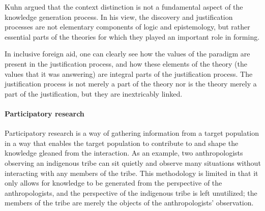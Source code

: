 \documentclass[a4paper]{article}
\begin{document}
Kuhn argued that the context distinction is not a fundamental aspect of the
knowledge generation process. In his view, the discovery and justification
processes are not elementary components of logic and epistemology, but rather
essential parts of the theories for which they played an important role in
forming.

In inclusive foreign aid, one can clearly see how the values of the paradigm
are present in the justification process, and how these elements of the theory
(the values that it was answering) are integral parts of the justification
process.  The justification process is not merely a part of the theory nor is
the theory merely a part of the justification, but they are inextricably
linked.

\paragraph{Participatory research}
\label{part}

Participatory research is a way of gathering information from a target
population in a way that enables the target population to contribute to and
shape the knowledge gleaned from the interaction. As an example, two
anthropologists observing an indigenous tribe can sit quietly and observe many
situations without interacting with any members of the tribe. This methodology
is limited in that it only allows for knowledge to be generated from the
perspective of the anthropologists, and the perspective of the indigenous
tribe is left unutilized; the members of the tribe are merely the objects of
the anthropologists' observation. 
\end{document}
